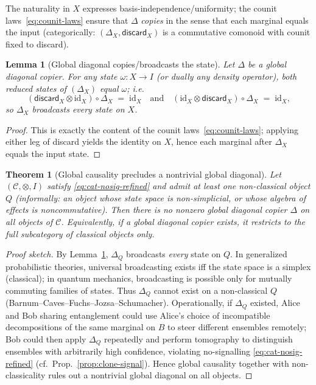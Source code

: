 \documentclass[11pt]{article}
\theoremstyle{upright}
\newtheorem{theorem}{Theorem}
\newtheorem{lemma}{Lemma}
\begin{document}
The naturality in $X$ expresses basis-independence/uniformity; the counit laws~\eqref{eq:counit-laws} ensure that $\Delta$ \emph{copies} in the sense that each marginal equals the input (categorically: $(\Delta_X,\mathsf{discard}_X)$ is a commutative comonoid with counit fixed to discard).

\begin{lemma}[Global diagonal copies/broadcasts the state]
\label{lem:diagonal-broadcasts}
Let $\Delta$ be a global diagonal copier. For any state $\omega:X\to I$ (or dually any density operator), both reduced states of $(\Delta_X)$ equal $\omega$; i.e.
\[
(\mathsf{discard}_X\!\otimes\!\mathrm{id}_X)\circ \Delta_X \;=\;\mathrm{id}_X
\quad\text{and}\quad
(\mathrm{id}_X\!\otimes\!\mathsf{discard}_X)\circ \Delta_X \;=\;\mathrm{id}_X,
\]
so $\Delta_X$ \emph{broadcasts} every state on $X$.
\end{lemma}

\begin{proof}
This is exactly the content of the counit laws~\eqref{eq:counit-laws}; applying either leg of discard yields the identity on $X$, hence each marginal after $\Delta_X$ equals the input state.
\end{proof}

\begin{theorem}[Global causality precludes a nontrivial global diagonal]
\label{thm:causal-nodiagonal-refined}
Let $(\mathcal{C},\otimes,I)$ satisfy \eqref{eq:cat-nosig-refined} and admit at least one \emph{non-classical} object $Q$ (informally: an object whose state space is non-simplicial, or whose algebra of effects is noncommutative). Then there is no nonzero global diagonal copier $\Delta$ on all objects of $\mathcal{C}$. Equivalently, if a global diagonal copier exists, it restricts to the full subcategory of \emph{classical} objects only.
\end{theorem}

\begin{proof}[Proof sketch]
By Lemma~\ref{lem:diagonal-broadcasts}, $\Delta_Q$ broadcasts \emph{every} state on $Q$. In generalized probabilistic theories, universal broadcasting exists iff the state space is a simplex (classical); in quantum mechanics, broadcasting is possible only for mutually commuting families of states. Thus $\Delta_Q$ cannot exist on a non-classical $Q$ (Barnum--Caves--Fuchs--Jozsa--Schumacher). Operationally, if $\Delta_Q$ existed, Alice and Bob sharing entanglement could use Alice's choice of incompatible decompositions of the same marginal on $B$ to steer different ensembles remotely; Bob could then apply $\Delta_Q$ repeatedly and perform tomography to distinguish ensembles with arbitrarily high confidence, violating no-signalling \eqref{eq:cat-nosig-refined} (cf.\ Prop.~\ref{prop:clone-signal}). Hence global causality together with non-classicality rules out a nontrivial global diagonal on all objects.
\end{proof}
\end{document}
